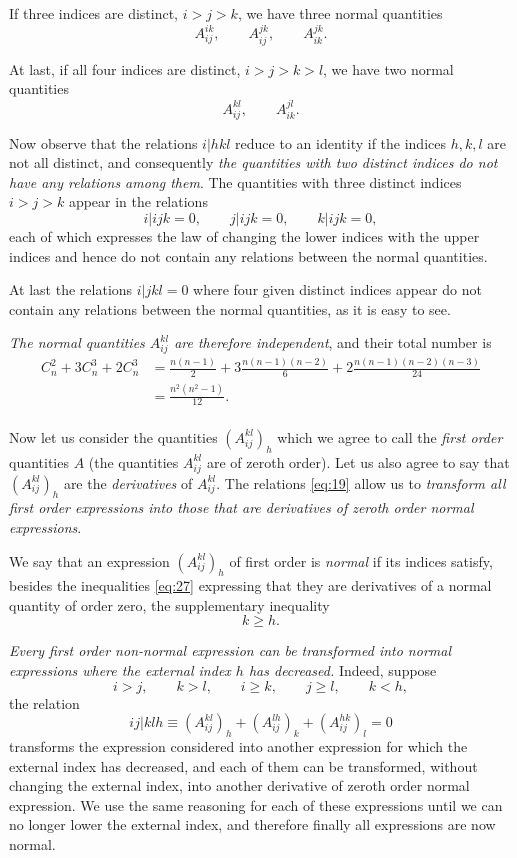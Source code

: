 \documentclass[leqno,12pt]{article}
\theoremstyle{shape1}
\theoremstyle{shape0}
\theoremstyle{shape2}
\theoremstyle{definition}
\begin{document}
If three indices are distinct, $i>j>k$, we have three normal quantities
\[
A^{ik}_{ij},\qquad A^{jk}_{ij},\qquad A^{jk}_{ik}.
\]

At last, if all four indices are distinct, $i>j>k>l$, we have two normal quantities
\[
A^{kl}_{ij},\qquad A^{jl}_{ik}.
\]

Now observe that the relations $i|hkl$ reduce to an identity if the indices $h,k,l$ are not all distinct, and consequently \emph{the quantities with two distinct indices do not have any relations among them}. The quantities with three distinct indices $i>j>k$ appear in the relations
\[
i|ijk=0,\qquad j|ijk=0,\qquad k|ijk=0,
\]
each of which expresses the law of changing the lower indices with the upper indices and hence do not contain any relations between the normal quantities.

At last the relations $i|jkl=0$ where four given distinct indices appear do not contain any relations between the normal quantities, as it is easy to see.

\emph{The normal quantities $A^{kl}_{ij}$ are therefore independent}, and their total number is
\begin{align*}
  C^{2}_{n}+3C^{3}_{n}+2C^{3}_{n}&=\frac{n(n-1)}{2}+3\frac{n(n-1)(n-2)}{6}+2\frac{n(n-1)(n-2)(n-3)}{24}\\
  &=\frac{n^{2}(n^{2}-1)}{12}.
\end{align*}


\paragraph{}
\label{sec:11}
Now let us consider the quantities $(A^{kl}_{ij})_{h}$ which we agree to call the \emph{first order} quantities $A$ (the quantities $A^{kl}_{ij}$ are of zeroth order). Let us also agree to say that $(A^{kl}_{ij})_{h}$ are the  \emph{derivatives} of $A^{kl}_{ij}$. The relations \eqref{eq:19} allow us to \emph{transform all first order expressions into those that are derivatives of zeroth order normal expressions}.

We say that an expression $(A^{kl}_{ij})_{h}$ of first order is \emph{normal} if its indices satisfy, besides the inequalities \eqref{eq:27} expressing that they are derivatives of a normal quantity of order zero, the supplementary inequality
\begin{equation}
  \label{eq:28}
  k\ge h.
\end{equation}

\emph{Every first order non-normal expression can be transformed into normal expressions where the external index $h$ has decreased.} Indeed, suppose
\[
i>j,\qquad k>l,\qquad i\ge k,\qquad j\ge l,\qquad k<h,
\]
the relation
\[
ij|klh\equiv (A^{kl}_{ij})_{h}+(A^{lh}_{ij})_{k}+(A^{hk}_{ij})_{l}=0
\]
transforms the expression considered into another expression for which the external index has decreased, and each of them can be transformed, without changing the external index, into another derivative of zeroth order normal expression. We use the same reasoning for each of these expressions until we can no longer lower the external index, and therefore finally all expressions are now normal.
\end{document}
